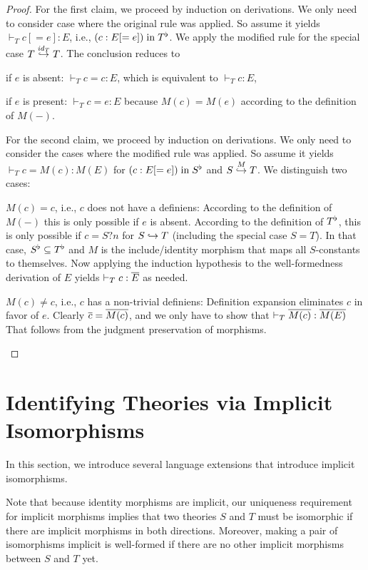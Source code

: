 \begin{proof}
For the first claim, we proceed by induction on derivations.
We only need to consider case where the original rule was applied.
So assume it yields $\vdash_T c[=e]:E$, i.e., $(c:E[=e]) \minn \flt{T}$.
We apply the modified rule for the special case $\ipc{\id{T}}{T}{T}$.
The conclusion reduces to
\begin{compactitem}
 \item if $e$ is absent: $\vdash_T c=c:E$, which is equivalent to $\vdash_T c:E$,
 \item if $e$ is present: $\vdash_T c=e:E$ because $M(c)=M(e)$ according to the definition of $M(-)$.
\end{compactitem}

For the second claim, we proceed by induction on derivations.
We only need to consider the cases where the modified rule was applied.
So assume it yields $\vdash_T c=M(c):M(E)$ for $(c:E[=e]) \minn \flt{S}$ and $\ipc{M}{S}{T}$.
We distinguish two cases:
\begin{compactitem}
 \item $M(c)=c$, i.e., $c$ does not have a definiens:
   According to the definition of $M(-)$ this is only possible if $e$ is absent.
   According to the definition of $\flt{T}$, this is only possible if $c=S?n$ for $S\harr T$ (including the special case $S=T$).
   In that case, $\flt{S}\sq\flt{T}$ and $M$ is the include/identity morphism that maps all $S$-constants to themselves.
   Now applying the induction hypothesis to the well-formedness derivation of $E$ yields $\vdash_T c:\ov{E}$ as needed.
 \item $M(c)\neq c$, i.e., $c$ has a non-trivial definiens:
  Definition expansion eliminates $c$ in favor of $e$.
  Clearly $\ov{c}=\ov{M(c)}$, and we only have to show that $\vdash_T \ov{M(c)}:\ov{M(E)}$ That follows from the judgment preservation of morphisms.
\end{compactitem}
\end{proof}

\section{Identifying Theories via Implicit Isomorphisms}\label{sec:inverse}

In this section, we introduce several language extensions that introduce implicit isomorphisms.

Note that because identity morphisms are implicit, our uniqueness requirement for implicit morphisms implies that two theories $S$ and $T$ must be isomorphic if there are implicit morphisms in both directions.
Moreover, making a pair of isomorphisms implicit is well-formed if there are no other implicit morphisms between $S$ and $T$ yet.

